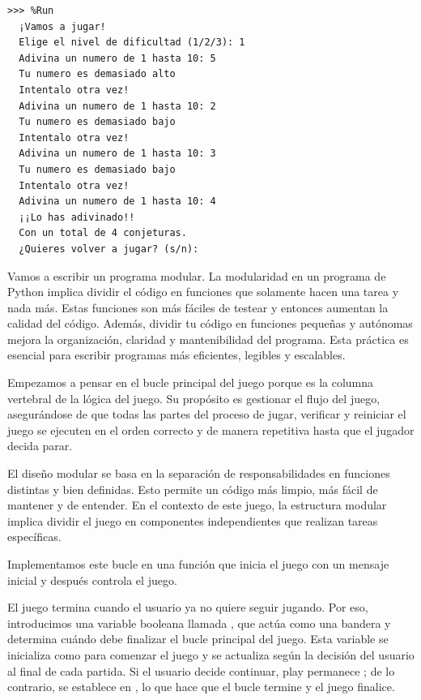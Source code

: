 \begin{Verbatim}[frame=single, label={\em example test execution of the program}]
>>> %Run 
  ¡Vamos a jugar!
  Elige el nivel de dificultad (1/2/3): 1
  Adivina un numero de 1 hasta 10: 5
  Tu numero es demasiado alto
  Intentalo otra vez!
  Adivina un numero de 1 hasta 10: 2
  Tu numero es demasiado bajo
  Intentalo otra vez!
  Adivina un numero de 1 hasta 10: 3
  Tu numero es demasiado bajo
  Intentalo otra vez!
  Adivina un numero de 1 hasta 10: 4
  ¡¡Lo has adivinado!!
  Con un total de 4 conjeturas.
  ¿Quieres volver a jugar? (s/n): 
\end{Verbatim}


Vamos a escribir un programa modular. La modularidad en un programa de Python implica dividir el código en funciones que solamente hacen una tarea y nada más. Estas funciones son más fáciles de testear y entonces aumentan la calidad del código. Además, 
dividir tu código en funciones pequeñas y autónomas mejora la organización, claridad y mantenibilidad del programa. Esta práctica es esencial para escribir programas más eficientes, legibles y escalables.

Empezamos a pensar en el bucle principal del juego porque es la columna vertebral de la lógica del juego. Su propósito es gestionar el flujo del juego, asegurándose de que todas las partes del proceso de jugar, verificar y reiniciar el juego se ejecuten en el orden correcto y de manera repetitiva hasta que el jugador decida parar.

El diseño modular se basa en la separación de responsabilidades en funciones distintas y bien definidas. Esto permite un código más limpio, más fácil de mantener y de entender. En el contexto de este juego, la estructura modular implica dividir el juego en componentes independientes que realizan tareas específicas.

Implementamos este bucle en una función  que inicia el juego con un mensaje inicial y después controla el juego.

El juego termina cuando el usuario ya no quiere seguir jugando. Por eso, introducimos una variable booleana llamada , que actúa como una bandera y determina cuándo debe finalizar el bucle principal del juego. Esta variable se inicializa como  para comenzar el juego y se actualiza según la decisión del usuario al final de cada partida. Si el usuario decide continuar, play permanece ; de lo contrario, se establece en , lo que hace que el bucle termine y el juego finalice.

